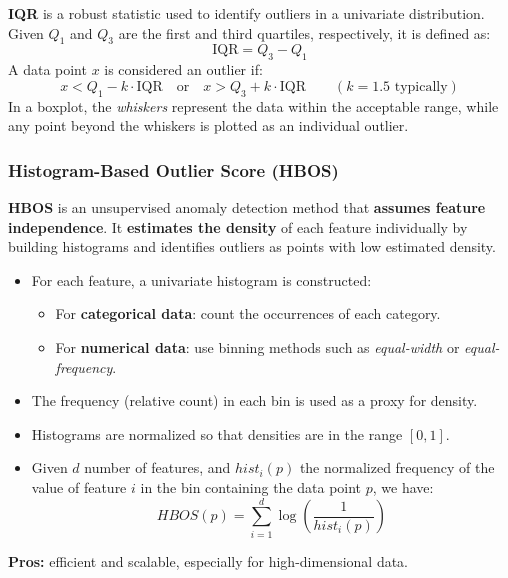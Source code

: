 \textbf{IQR} is a robust statistic used to identify outliers in a univariate distribution. Given \( Q_1 \) and \( Q_3 \) are the first and third quartiles, respectively, it is defined as:
\begin{equation}
\text{IQR} = Q_3 - Q_1    
\end{equation}
A data point \( x \) is considered an outlier if:
\begin{equation}
x < Q_1 - k \cdot \text{IQR} \quad \text{or} \quad x > Q_3 + k \cdot \text{IQR}    \qquad (k = 1.5 \text{ typically})
\end{equation}
In a boxplot, the \textit{whiskers} represent the data within the acceptable range, while any point beyond the whiskers is plotted as an individual outlier.

\subsubsection{Histogram-Based Outlier Score (HBOS)}

\textbf{HBOS} is an unsupervised anomaly detection method that \textbf{assumes feature independence}. It \textbf{estimates the density} of each feature individually by building histograms and identifies outliers as points with low estimated density.

\begin{itemize}
  \item For each feature, a univariate histogram is constructed:
    \begin{itemize}
      \item For \textbf{categorical data}: count the occurrences of each category.
      \item For \textbf{numerical data}: use binning methods such as \textit{equal-width} or \textit{equal-frequency}.
    \end{itemize}
  \item The frequency (relative count) in each bin is used as a proxy for density.
  \item Histograms are normalized so that densities are in the range $[0, 1]$.
  \item Given $d$ number of features, and $hist_i(p)$ the normalized frequency of the value of feature $i$ in the bin containing the data point $p$, we have:
  \begin{equation}
  HBOS(p) = \sum_{i=1}^{d} \log\left(\frac{1}{hist_i(p)}\right)      
  \end{equation}
\end{itemize}
\textbf{Pros:} efficient and scalable, especially for high-dimensional data.

